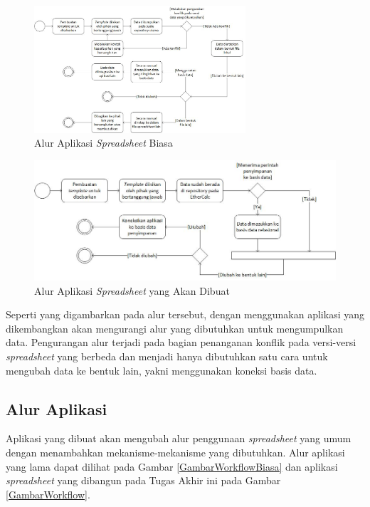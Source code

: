 \begin{figure}[htb]
    \centering
    \includegraphics[width=0.7\textwidth]{resources/chapter-3-workflow-kerja-biasa.jpg}
    \caption{Alur Aplikasi \textit{Spreadsheet} Biasa}
	\label{GambarWorkflowKerjaBiasa}
\end{figure}

\begin{figure}[htb]
    \centering
    \includegraphics[width=1\textwidth]{resources/chapter-3-workflow-kerja.jpg}
    \caption{Alur Aplikasi \textit{Spreadsheet} yang Akan Dibuat}
	\label{GambarWorkflowKerja}
\end{figure}

Seperti yang digambarkan pada alur tersebut, dengan menggunakan aplikasi yang dikembangkan akan mengurangi alur yang dibutuhkan untuk mengumpulkan data. Pengurangan alur terjadi pada bagian penanganan konflik pada versi-versi \textit{spreadsheet} yang berbeda dan menjadi hanya dibutuhkan satu cara untuk mengubah data ke bentuk lain, yakni menggunakan koneksi basis data.

\subsection{Alur Aplikasi}
Aplikasi yang dibuat akan mengubah alur penggunaan \textit{spreadsheet} yang umum dengan menambahkan mekanisme-mekanisme yang dibutuhkan. Alur aplikasi yang lama dapat dilihat pada Gambar \ref{GambarWorkflowBiasa} dan aplikasi \textit{spreadsheet} yang dibangun pada Tugas Akhir ini pada Gambar \ref{GambarWorkflow}.

